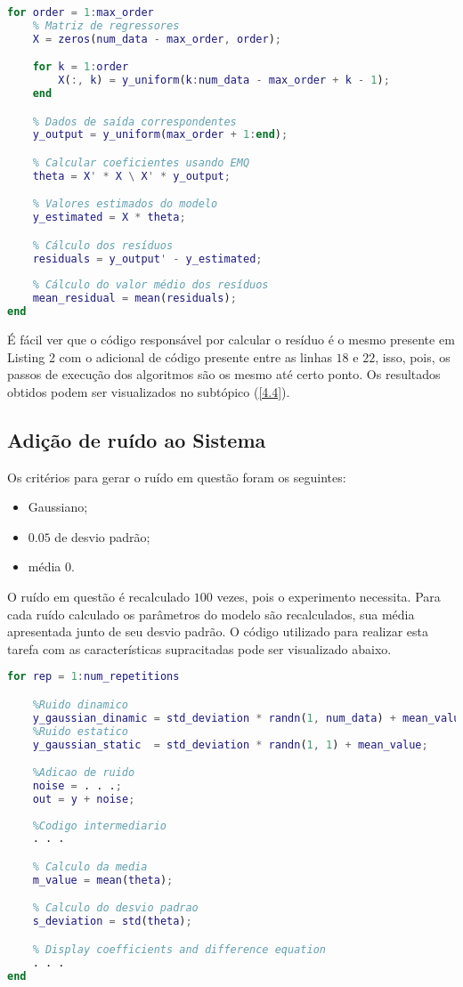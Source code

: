 \documentclass[a4paper,12pt]{article}
\begin{document}
\begin{lstlisting}[language=Matlab, caption=Calculo do resíduo e sua média]
for order = 1:max_order
    % Matriz de regressores
    X = zeros(num_data - max_order, order);

    for k = 1:order
        X(:, k) = y_uniform(k:num_data - max_order + k - 1);
    end

    % Dados de saída correspondentes
    y_output = y_uniform(max_order + 1:end);

    % Calcular coeficientes usando EMQ
    theta = X' * X \ X' * y_output;

    % Valores estimados do modelo
    y_estimated = X * theta;

    % Cálculo dos resíduos
    residuals = y_output' - y_estimated;
  
    % Cálculo do valor médio dos resíduos
    mean_residual = mean(residuals);
end
\end{lstlisting}

É fácil ver que o código responsável por calcular o resíduo é o mesmo presente em Listing 2 com o adicional de código presente entre as linhas $18$ e $22$, isso, pois, os passos de execução dos algoritmos são os mesmo até certo ponto. Os resultados obtidos podem ser visualizados no subtópico (\ref{4.4}).

\subsection{Adição de ruído ao Sistema}\label{3.5}

Os critérios para gerar o ruído em questão foram os seguintes:
\begin{itemize}
    \item Gaussiano;
    \item $0.05$ de desvio padrão;
    \item média 0.
\end{itemize}

O ruído em questão é recalculado $100$ vezes, pois o experimento necessita. Para cada ruído calculado os parâmetros do modelo são recalculados, sua média apresentada junto de seu desvio padrão. O código utilizado para realizar esta tarefa com as características supracitadas pode ser visualizado abaixo.

\begin{lstlisting}[language=Matlab, caption=Adição de ruído ao sistema]
for rep = 1:num_repetitions

    %Ruido dinamico
    y_gaussian_dinamic = std_deviation * randn(1, num_data) + mean_value;
    %Ruido estatico
    y_gaussian_static  = std_deviation * randn(1, 1) + mean_value;

    %Adicao de ruido
    noise = . . .;
    out = y + noise;
    
    %Codigo intermediario
    . . .

    % Calculo da media
    m_value = mean(theta);

    % Calculo do desvio padrao
    s_deviation = std(theta);

    % Display coefficients and difference equation
    . . .
end
\end{lstlisting}
\end{document}
